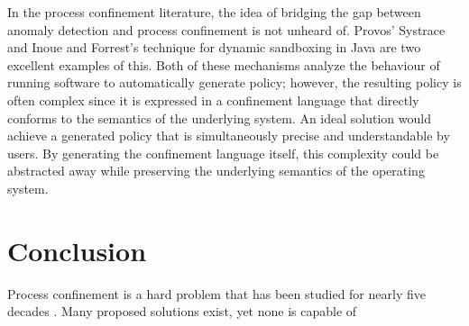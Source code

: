 \documentclass[dvipsnames, 12pt]{article}
\begin{document}
In the process confinement literature, the idea of bridging the gap between
anomaly detection and process confinement is not unheard of. Provos' Systrace
\cite{provos2003_systrace} and Inoue and Forrest's technique for dynamic
sandboxing in Java \cite{inoue05_java, inoue05_thesis} are two excellent
examples of this. Both of these mechanisms analyze the behaviour of running
software to automatically generate policy; however, the resulting policy is
often complex since it is expressed in a confinement language that directly
conforms to the semantics of the underlying system. An ideal solution would
achieve a generated policy that is simultaneously precise and understandable by
users. By generating the confinement language itself, this complexity could be
abstracted away while preserving the underlying semantics of the operating
system.

%

\section{Conclusion}
\label{sec:conclusion}

Process confinement is a hard problem that has been studied for nearly
five decades \cite{lampson1973_a_note}. Many proposed solutions exist,
yet none is capable of 

\clearpage
\singlespacing
\printbibliography
\end{document}
